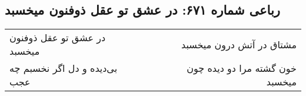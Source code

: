 \begin{center}
\section*{رباعی شماره ۶۷۱: در عشق تو عقل ذوفنون میخسبد}
\label{sec:0671}
\begin{longtable}{l p{0.5cm} r}
در عشق تو عقل ذوفنون میخسبد
&&
مشتاق در آتش درون میخسبد
\\
بی‌دیده و دل اگر نخسبم چه عجب
&&
خون گشته مرا دو دیده چون میخسبد
\\
\end{longtable}
\end{center}
